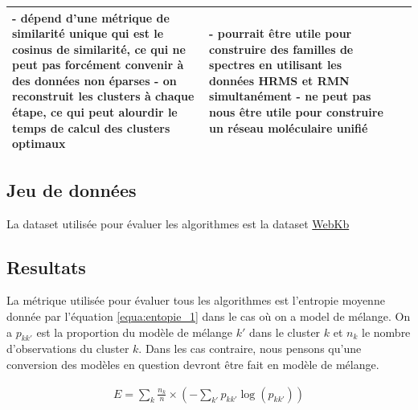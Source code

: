 \documentclass[12pt, french, latin.medieval, a4paper]{report}
\begin{document}
\begin{center}
\begin{longtable}{|p{2.5cm}|p{4.5cm}|p{4.5cm}|p{3cm}|}
                    	{\textbf{-} dépend d'une métrique de similarité unique qui est le cosinus de similarité, ce qui ne peut pas forcément convenir à des données non éparses} \newline\newline
                    	{\textbf{-} on reconstruit les clusters à chaque étape, ce qui peut alourdir le temps de calcul des clusters optimaux}
                    	&
                    	{\textbf{-} pourrait être utile pour construire des familles de spectres en utilisant les données HRMS et RMN simultanément} \newline\newline
                    	{\textbf{-} ne peut pas nous être utile pour construire un réseau moléculaire unifié }
                    	\\
                	\hline
            	\end{longtable}
        	\end{center}

    	\subsection{Jeu de données}
        	La dataset utilisée pour évaluer les algorithmes est la dataset \href{ttp://www.cs.cmu.edu/afs/cs.cmu.edu/project/theo-20/www/data/}{WebKb}

        \subsection{Resultats}
    	La métrique utilisée pour évaluer tous les algorithmes est l'entropie moyenne donnée par l'équation \ref{equa:entopie_1} dans le cas où on a model de mélange. On a $p_{kk'}$ est la proportion du modèle de mélange $k'$ dans le cluster $k$ et $n_k$ le nombre d'observations du cluster $k$. Dans les cas contraire, nous pensons qu'une conversion des modèles en question devront être fait en modèle de mélange.
 
        \begin{equation}
            \begin{aligned}
                E = \sum_k  \frac{ n_k }{ n } \times ( - \sum_{k'} p_{kk'}\log(p_{kk'}))
            \end{aligned}
            \label{equa:entopie_1} 
        \end{equation}
 
\end{document}
